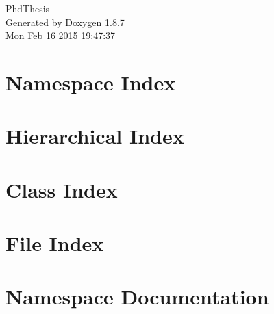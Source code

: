 \documentclass[twoside]{book}
\newcommand{\+}{\discretionary{\mbox{\scriptsize$\hookleftarrow$}}{}{}}
\newcommand{\clearemptydoublepage}{%
  \newpage{\pagestyle{empty}\cleardoublepage}%
}
\begin{document}
\hypersetup{pageanchor=false,
             bookmarks=true,
             bookmarksnumbered=true,
             pdfencoding=unicode
            }
\begin{titlepage}
\vspace*{7cm}
\begin{center}%
{\Large Phd\+Thesis }\\
\vspace*{1cm}
{\large Generated by Doxygen 1.8.7}\\
\vspace*{0.5cm}
{\small Mon Feb 16 2015 19:47:37}\\
\end{center}
\end{titlepage}
\clearemptydoublepage
\tableofcontents
\clearemptydoublepage
{}
\hypersetup{pageanchor=true}

\chapter{Namespace Index}

\chapter{Hierarchical Index}

\chapter{Class Index}

\chapter{File Index}

\chapter{Namespace Documentation}


\end{document}
